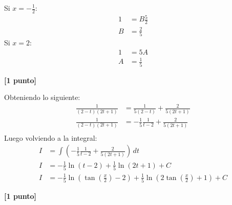 \documentclass[a4paper,10pt]{article}
\newcommand{\dis}{\displaystyle}
\begin{document}
\begin{enumerate}
Si $x=-\frac{1}{2}$:
\begin{align*}
 \dis 1  &=  \dis  B\frac{5}{2} \\
 \dis B  &=  \dis  \frac{2}{5}
\end{align*}
Si $x=2$:
\begin{align*}
 \dis 1  &=  \dis  5A \\
 \dis A  &=  \dis  \frac{1}{5}
\end{align*}

\dotfill \textbf{[1 punto]}

Obteniendo lo siguiente:
\begin{align*}
 \dis  \frac{ 1}{(2-t)(2t+1)}  &=  \dis  \frac{1}{5(2-t)} + \dis  \frac{2}{5(2t+1)} \\
 \dis  \frac{ 1}{(2-t)(2t+1)}  &=  \dis  -\frac{1}{5} \frac{1}{t-2} + \dis  \frac{2}{5(2t+1)} \\
\end{align*}
Luego volviendo a la integral:
\begin{align*}
  I  &=  \dis   \int   \left(-\frac{1}{5} \frac{1}{t-2} + \dis  \frac{2}{5(2t+1)}\right) \, dt \\
  I  &=  \dis  -\frac{1}{5} \ln(t-2) + \frac{1}{5}   \ln(2t+1) + C \\
I  &=  \dis  -\frac{1}{5} \ln{\left(\tan\left(\frac{x}{2}\right)-2\right)} + \frac{1}{5}   \ln\left(2\tan\left(\frac{x}{2}\right)+1\right) + C
\end{align*}

\dotfill \textbf{[1 punto]}



\end{enumerate}
\vspace{10mm}
\end{document}
